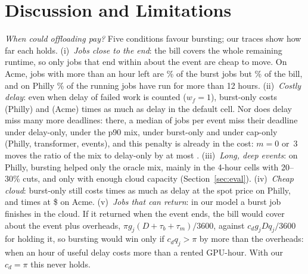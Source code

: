 \section{Discussion and Limitations}
\label{sec:discussion}

\emph{When could offloading pay?} Five conditions favour bursting; our traces show how far each holds. (i)~\emph{Jobs close to the end}: the bill covers the whole remaining runtime, so only jobs that end within about the event are cheap to move. On Acme, jobs with more than an hour left are \AcmeBurstLongJobsPct\% of the burst jobs but \AcmeBurstLongUsdPct\% of the bill, and on Philly \MotRunningBeyondGridJobsPct\% of the running jobs have run for more than 12 hours. (ii)~\emph{Costly delay}: even when delay of failed work is counted ($w_f=1$), burst-only costs \BurstOverDelayDefaultOne{} (Philly) and \AcmeBurstOverDelayDefaultOne{} (Acme) times as much as delay in the default cell. Nor does delay miss many more deadlines: there, a median of \EfourDelayMissedMedian{} jobs per event miss their deadline under delay-only, \EfourMixPNineMissedMedian{} under the p90 mix, \EfourBurstMissedMedian{} under burst-only and \EfourCapMissedMedian{} under cap-only (Philly, transformer, \EfourEvents{} events), and this penalty is already in the cost: $m=0$ or~3 moves the ratio of the mix to delay-only by at most \SensMissShiftMax{}. (iii)~\emph{Long, deep events}: on Philly, bursting helped only the oracle mix, mainly in the 4-hour cells with 20--30\% cuts, and only with enough cloud capacity (Section~\ref{sec:eval}). (iv)~\emph{Cheap cloud}: burst-only still costs \PriceSpotBurstOverDelay{} times as much as delay at the spot price on Philly, and \AcmeCheapBurstTransformerOverDelayZero{} times at \$\AcmeCheapPrice{} on Acme. (v)~\emph{Jobs that can return}: in our model a burst job finishes in the cloud. If it returned when the event ends, the bill would cover about the event plus overheads, $\pi g_j(D+\tau_b+\tau_m)/3600$, against $c_d g_j D q_j/3600$ for holding it, so bursting would win only if $c_d q_j>\pi$ by more than the overheads: when an hour of useful delay costs more than a rented GPU-hour. With our $c_d=\pi$ this never holds.

